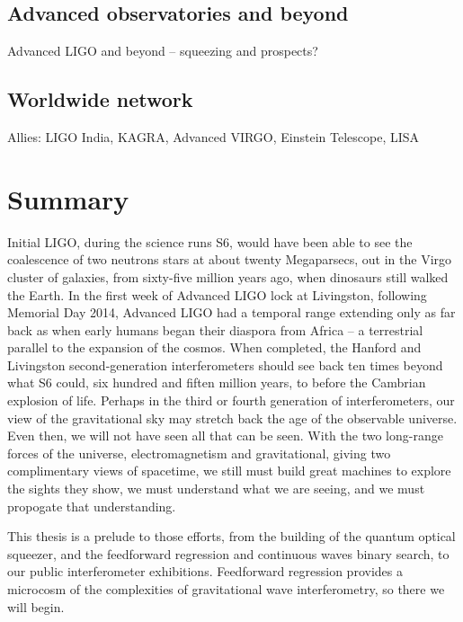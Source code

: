         \subsection{Advanced observatories and beyond}
        \label{advanced}
  
            Advanced LIGO and beyond -- squeezing and prospects?

        \subsection{Worldwide network}
        \label{worldwide}
 
            Allies: LIGO India, KAGRA, Advanced VIRGO, Einstein Telescope, LISA

    \section{Summary}
    \label{intro_summary}
 

Initial LIGO, during the science runs S6, would have been able to see the coalescence of two neutrons stars at about twenty Megaparsecs, out in the Virgo cluster of galaxies, from sixty-five million years ago, when dinosaurs still walked the Earth. 
In the first week of Advanced LIGO lock at Livingston, following Memorial Day 2014, Advanced LIGO had a temporal range extending only as far back as when early humans began their diaspora from Africa -- a terrestrial parallel to the expansion of the cosmos.
When completed, the Hanford and Livingston second-generation interferometers should see back ten times beyond what S6 could, six hundred and fiften million years, to before the Cambrian explosion of life.
Perhaps in the third or fourth generation of interferometers, our view of the gravitational sky may stretch back the age of the observable universe.
Even then, we will not have seen all that can be seen.
With the two long-range forces of the universe, electromagnetism and gravitational, giving two complimentary views of spacetime, we still must build great machines to explore the sights they show, we must understand what we are seeing, and we must propogate that understanding. 

This thesis is a prelude to those efforts, from the building of the quantum optical squeezer, and the feedforward regression and continuous waves binary search, to our public interferometer exhibitions.   
Feedforward regression provides a microcosm of the complexities of gravitational wave interferometry, so there we will begin.


